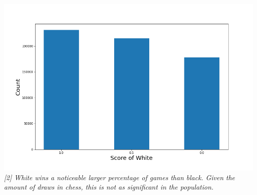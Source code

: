 \documentclass[12pt, letterpaper]{article}
\begin{document}
\begin{multicols}{2}
\begin{center}
\begin{scriptsize}
\end{scriptsize}
\end{center}

\setlength{\parskip}{0.0cm}
\begin{center}
\begin{scriptsize}

\includegraphics[width=\linewidth]{../figures/LiChessFigs/white_win.png}
\textit{[2] White wins a noticeable larger percentage of games than black. Given the amount of draws in chess, this is not as significant in the population.}

\end{scriptsize}
\end{center}

\setlength{\parskip}{0.0cm}
\begin{center}
\begin{scriptsize}


\end{scriptsize}
\end{center}
\end{multicols}
\end{document}
